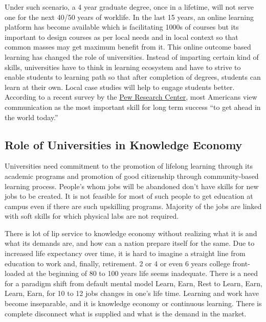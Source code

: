 \documentclass[
  12pt]{article}
\begin{document}
Under such scenario, a 4 year graduate degree, once in a lifetime, will
not serve one for the next 40/50 years of worklife. In the last 15
years, an online learning platform has become available which is
facilitating 1000s of courses but its important to design courses as per
local needs and in local context so that common masses may get maximum
benefit from it. This online outcome based learning has changed the role
of universities. Instead of imparting certain kind of skills,
universities have to think in learning ecosystem and have to strive to
enable students to learning path so that after completion of degrees,
students can learn at their own. Local case studies will help to engage
students better. According to a recent survey by the
\href{https://www.pewresearch.org/fact-tank/2015/02/19/skills-for-success/}{Pew
Research Center}, most Americans view communication as the most
important skill for long term success ``to get ahead in the world
today.''

\hypertarget{role-of-universities-in-knowledge-economy}{%
\subsection{Role of Universities in Knowledge
Economy}\label{role-of-universities-in-knowledge-economy}}

Universities need commitment to the promotion of lifelong learning
through its academic programs and promotion of good citizenship through
community-based learning process. People's whom jobs will be abandoned
don't have skills for new jobs to be created. It is not feasible for
most of such people to get education at campus even if there are such
upskilling programs. Majority of the jobs are linked with soft skills
for which physical labs are not required.

There is lot of lip service to knowledge economy without realizing what
it is and what its demands are, and how can a nation prepare itself for
the same. Due to increased life expectancy over time, it is hard to
imagine a straight line from education to work and, finally, retirement.
2 or 4 or even 6 years college front-loaded at the beginning of 80 to
100 years life seems inadequate. There is a need for a paradigm shift
from default mental model Learn, Earn, Rest to Learn, Earn, Learn, Earn,
for 10 to 12 jobs changes in one's life time. Learning and work have
become inseparable, and it is knowledge economy or continuous learning.
There is complete disconnect what is supplied and what is the demand in
the market.
\end{document}
